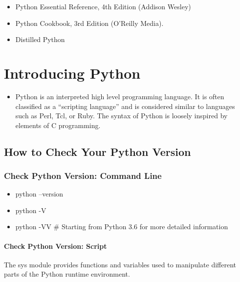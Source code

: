 \documentclass[
  letterpaper,
  DIV=11,
  numbers=noendperiod]{scrreprt}
\providecommand{\tightlist}{%
  \setlength{\itemsep}{0pt}\setlength{\parskip}{0pt}}
\begin{document}
\begin{itemize}
\item
  Python Essential Reference, 4th Edition (Addison Wesley)
\item
  Python Cookbook, 3rd Edition (O'Reilly Media).
\item
  Distilled Python
\end{itemize}

\hypertarget{introducing-python}{%
\section{Introducing Python}\label{introducing-python}}

\begin{itemize}
\tightlist
\item
  Python is an interpreted high level programming language. It is often
  classified as a ``scripting language'' and is considered similar to
  languages such as Perl, Tcl, or Ruby. The syntax of Python is loosely
  inspired by elements of C programming.
\end{itemize}

\hypertarget{how-to-check-your-python-version}{%
\subsection{How to Check Your Python
Version}\label{how-to-check-your-python-version}}

\hypertarget{check-python-version-command-line}{%
\subsubsection{Check Python Version: Command
Line}\label{check-python-version-command-line}}

\begin{itemize}
\tightlist
\item
  python --version
\item
  python -V
\item
  python -VV \# Starting from Python 3.6 for more detailed information
\end{itemize}

\hypertarget{check-python-version-script}{%
\paragraph{Check Python Version:
Script}\label{check-python-version-script}}

The sys module provides functions and variables used to manipulate
different parts of the Python runtime environment.
\end{document}
